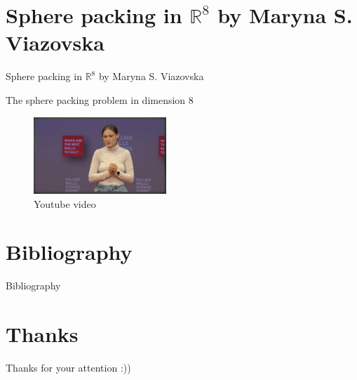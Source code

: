 \documentclass[10pt]{beamer}
\begin{document}
\section{Sphere packing in $\mathbb{R}^8$ by Maryna S. Viazovska}
\begin{frame}{Sphere packing in $\mathbb{R}^8$ by Maryna S. Viazovska}

The sphere packing problem in
dimension $8$

\begin{figure}[t]
    \includegraphics[width=5cm]{maryna.png}
    \centering
    \caption{Youtube video}
    \end{figure}

\href{https://www.youtube.com/watch?v=ZxT0jNzYEko}{\LARGE{}}
\end{frame}
 

\section{Bibliography}

\begin{frame}{Bibliography}
 
\end{frame}

\section{Thanks}
\begin{frame}{Thanks for your attention :))}
\end{frame} 
\end{document}
